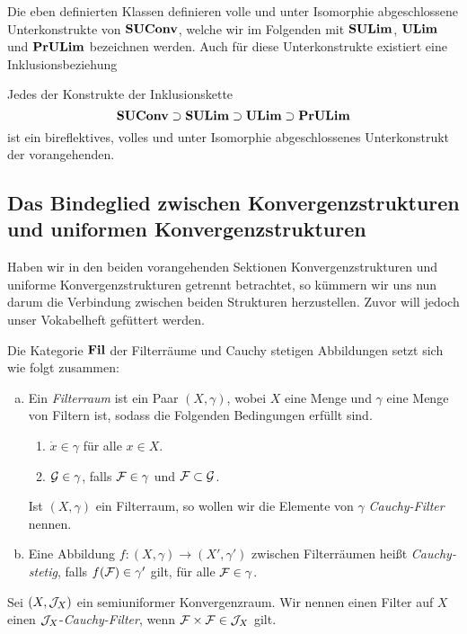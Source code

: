 Die eben definierten Klassen definieren volle und unter Isomorphie abgeschlossene Unterkonstrukte von $\mathbf{SUConv}$, welche wir im Folgenden mit $\mathbf{SULim}$, $\mathbf{ULim}$ und $\mathbf{PrULim}$ bezeichnen werden.
Auch für diese Unterkonstrukte existiert eine Inklusionsbeziehung

\begin{prop}
  Jedes der Konstrukte der Inklusionskette
  $$
  \mathbf{SUConv} \supset \mathbf{SULim} \supset \mathbf{ULim} \supset \mathbf{PrULim}
  $$
  ist ein bireflektives, volles und unter Isomorphie abgeschlossenes Unterkonstrukt der vorangehenden.
\end{prop}


\subsection{Das Bindeglied zwischen Konvergenzstrukturen und uniformen Konvergenzstrukturen}

Haben wir in den beiden vorangehenden Sektionen Konvergenzstrukturen und uniforme Konvergenzstrukturen getrennt betrachtet, so kümmern wir uns nun darum die Verbindung zwischen beiden Strukturen herzustellen.
Zuvor will jedoch unser Vokabelheft gefüttert werden.

\begin{defn}
  Die Kategorie $\mathbf{Fil}$ der Filterräume und Cauchy stetigen Abbildungen setzt sich wie folgt zusammen:
  \begin{enumerate}[a)]
    \item Ein \emph{Filterraum} ist ein Paar $(X, \gamma)$, wobei $X$ eine Menge und $\gamma$ eine Menge von Filtern ist, sodass die Folgenden Bedingungen erfüllt sind.
      \begin{enumerate}[F1)]
        \item $\dot x \in \gamma$ für alle $x \in X$.
        \item $\mathcal{G} \in \gamma$, falls $\mathcal{F} \in \gamma$ und $\mathcal{F} \subset \mathcal{G}$.
      \end{enumerate}
      Ist $(X,\gamma)$ ein Filterraum, so wollen wir die Elemente von $\gamma$ \emph{Cauchy-Filter} nennen.
    \item Eine Abbildung $f \colon (X, \gamma) \to (X', \gamma')$ zwischen Filterräumen heißt \emph{Cauchy-stetig}, falls $f(\mathcal{F}) \in \gamma'$ gilt, für alle $\mathcal{F} \in \gamma$.
  \end{enumerate}
\end{defn}

\begin{defn}
  Sei $(X, \mathcal{J}_X)$ ein semiuniformer Konvergenzraum.
  Wir nennen einen Filter auf $X$ einen $\mathcal{J}_X$-\emph{Cauchy-Filter}, wenn $\mathcal{F} \times \mathcal{F} \in \mathcal{J}_X$ gilt.
\end{defn}

